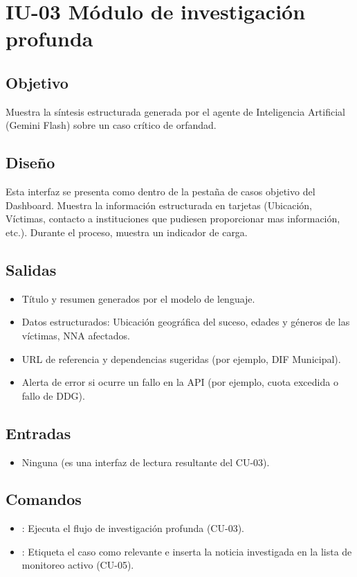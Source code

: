 \section{IU-03 Módulo de investigación profunda}

\subsection{Objetivo}
	Muestra la síntesis estructurada generada por el agente de Inteligencia Artificial (Gemini Flash) sobre un caso crítico de orfandad.

\subsection{Diseño}
	Esta interfaz se presenta como dentro de la pestaña de casos objetivo del Dashboard.
	Muestra la información estructurada en tarjetas (Ubicación, Víctimas, contacto a instituciones que pudiesen proporcionar mas información, etc.). Durante el proceso, muestra un indicador de carga.


\subsection{Salidas}
	\begin{itemize}
		\item Título y resumen generados por el modelo de lenguaje.
		\item Datos estructurados: Ubicación geográfica del suceso, edades y géneros de las víctimas, NNA afectados.
		\item URL de referencia y dependencias sugeridas (por ejemplo, DIF Municipal).
		\item Alerta de error si ocurre un fallo en la API (por ejemplo, cuota excedida o fallo de DDG).
	\end{itemize}
	
\subsection{Entradas}
	\begin{itemize}
		\item Ninguna (es una interfaz de lectura resultante del CU-03).
	\end{itemize}

\subsection{Comandos}
	\begin{itemize}
		\item {}: Ejecuta el flujo de investigación profunda (CU-03).
		\item {}: Etiqueta el caso como relevante e inserta la noticia investigada en la lista de monitoreo activo (CU-05).
	\end{itemize}
